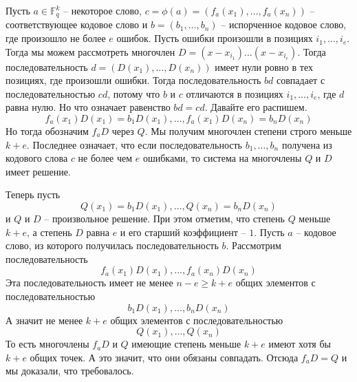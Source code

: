 Пусть $a\in \mathbb F_q^k$ -- некоторое слово, $c =\phi(a)= (f_a(x_1),\ldots,f_a(x_n))$ -- соответствующее кодовое слово и $b = (b_1,\ldots,b_n)$ -- испорченное кодовое слово, где произошло не более $e$ ошибок.
Пусть ошибки произошли в позициях $i_1,\ldots, i_e$.
Тогда мы можем рассмотреть многочлен $D = (x - x_{i_1})\ldots ( x - x_{i_e})$.
Тогда последовательность $d = (D(x_1),\ldots, D(x_n))$ имеет нули ровно в тех позициях, где произошли ошибки.
Тогда последовательность $b d$ совпадает с последовательностью $c d$, потому что $b$ и $c$ отличаются в позициях $i_1,\ldots, i_e$, где $d$ равна нулю.
Но что означает равенство $bd = cd$.
Давайте его распишем.
\[
f_a(x_1) D(x_1) = b_1 D(x_1),\ldots,f_a(x_1) D(x_n) = b_n D(x_n)
\]
Но тогда обозначим $f_a D$ через $Q$.
Мы получим многочлен степени строго меньше $k + e$.
Последнее означает, что если последовательность $b_1,\ldots, b_n$ получена из кодового слова $c$ не более чем $e$ ошибками, то система на многочлены $Q$ и $D$ имеет решение.

Теперь пусть
\[
Q(x_1) = b_1 D(x_1),\ldots,Q(x_n) = b_n D(x_n)
\]
и $Q$ и $D$ -- произвольное решение.
При этом отметим, что степень $Q$ меньше $k + e$, а степень $D$ равна $e$ и его старший коэффициент -- $1$.
Пусть $a$ -- кодовое слово, из которого получилась последовательность $b$.
Рассмотрим последовательность
\[
f_a(x_1) D(x_1),\ldots, f_a(x_n)D(x_n)
\]
Эта последовательность имеет не менее $n - e \geqslant k + e$ общих элементов с последовательностью 
\[
b_1D(x_1),\ldots,b_nD(x_n)
\]
А значит не менее $k + e$ общих элементов с последовательностью
\[
Q(x_1),\ldots, Q(x_n)
\]
То есть многочлены $f_aD$ и $Q$ имеющие степень меньше $k + e$ имеют хотя бы $k + e$ общих точек.
А это значит, что они обязаны совпадать.
Отсюда $f_a D = Q$ и мы доказали, что требовалось.
